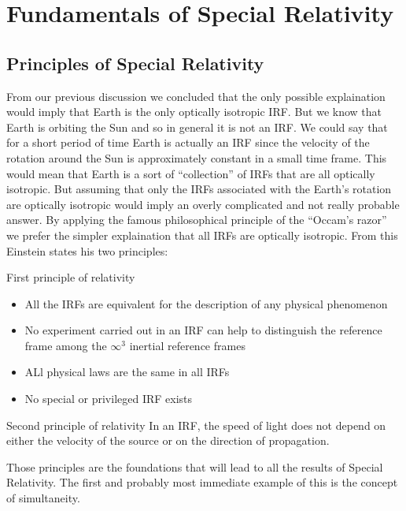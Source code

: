 \chapter{Fundamentals of Special Relativity}
\section{Principles of Special Relativity}
From our previous discussion we concluded that the only possible explaination would imply that Earth is the only optically isotropic IRF. But we know that Earth is orbiting the Sun and so in general it is not an IRF. We could say that for a short period of time Earth is actually an IRF since the velocity of the rotation around the Sun is approximately constant in a small time frame. This would mean that Earth is a sort of ``collection'' of IRFs that are all optically isotropic. But assuming that only the IRFs associated with the Earth's rotation are optically isotropic would imply an overly complicated and not really probable answer. By applying the famous philosophical principle of the ``Occam's razor'' we prefer the simpler explaination that all IRFs are optically isotropic.
From this Einstein states his two principles:
\begin{theorem}{First principle of relativity}
  \begin{itemize}
    \item All the IRFs are equivalent for the description of any physical phenomenon
    \item No experiment carried out in an IRF can help to distinguish the reference frame among the $\infty^3$ inertial reference frames
    \item ALl physical laws are the same in all IRFs
    \item No special or privileged IRF exists
  \end{itemize}
\end{theorem}
\begin{theorem}{Second principle of relativity}
  In an IRF, the speed of light does not depend on either the velocity of the source or on the direction of propagation.
\end{theorem}
Those principles are the foundations that will lead to all the results of Special Relativity. The first and probably most immediate example of this is the concept of simultaneity.
